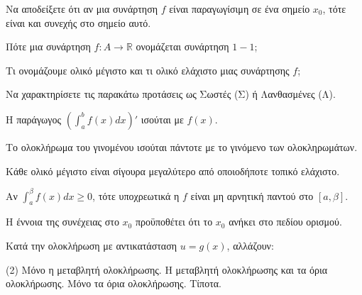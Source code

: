 \documentclass[11pt,a4paper]{article}
\newcommand{\kerkissans}[1]{{\fontfamily{maksf}\selectfont \textbf{#1}}}
\renewcommand{\textdexiakeraia}{}
\newcommand{\dint}{\displaystyle\int}
\newcommand\themanum{A}
\newcounter{thema}[section]
\renewcommand{\thethema}{\arabic{thema}}
\newcommand{\Thema}{\refstepcounter{thema}{\textbf{\textcolor{black}{\faPenSquare\ \  \large \kerkissans{\textbf{\thethemaο\hspace{2mm}Διαγώνισμα - Θέμα \themanum}}}}}\hspace{0mm}}{}
\newenvironment{thema}[1]
{\begin{tcolorbox}[title=\Thema\kerkissans{\textbf{\large{  #1}}},breakable,
enhanced standard,titlerule=0pt,toprule=0pt, rightrule=0pt, bottomrule=0pt,
colback=white,left=0mm,top=1mm,bottom=0mm,
boxrule=0pt,
colframe=white,leftrule=0mm,sharp corners,coltitle=black]
\renewcommand{\themanum}{#1}}
{\end{tcolorbox}}
\begin{document}
\begin{thema}{A}
\begin{erwthma}
    \item Να αποδείξετε ότι αν μια συνάρτηση $f$ είναι παραγωγίσιμη σε ένα σημείο $x_0$, τότε είναι και συνεχής στο σημείο αυτό.
    \item Πότε μια συνάρτηση $f:A\to\mathbb{R}$ ονομάζεται συνάρτηση $1-1$;
    \item Τι ονομάζουμε ολικό μέγιστο και τι ολικό ελάχιστο μιας συνάρτησης $f$;
    \item Να χαρακτηρίσετε τις παρακάτω προτάσεις ως Σωστές (Σ) ή Λανθασμένες (Λ).
    \begin{alist}
        \item Η παράγωγος $\left(\dint_a^b f(x) dx \right)'$ ισούται με $ f(x)$.
        \item Το ολοκλήρωμα του γινομένου ισούται πάντοτε με το γινόμενο των ολοκληρωμάτων.
        \item Κάθε ολικό μέγιστο είναι σίγουρα μεγαλύτερο από οποιοδήποτε τοπικό ελάχιστο.
        \item Αν $\dint_a^\beta f(x) dx \ge 0$, τότε υποχρεωτικά η $f$ είναι μη αρνητική παντού στο $[a, \beta]$.
        \item Η έννοια της συνέχειας στο $x_0$ προϋποθέτει ότι το $x_0$ ανήκει στο πεδίου ορισμού.
    \end{alist}
    \item Κατά την ολοκλήρωση με αντικατάσταση $u = g(x)$, αλλάζουν:
    \begin{tasks}[label=\let\textdexiakeraia\relax\alph*.](2)
        \task Μόνο η μεταβλητή ολοκλήρωσης.
        \task H μεταβλητή ολοκλήρωσης και τα όρια ολοκλήρωσης.
        \task Μόνο τα όρια ολοκλήρωσης.
        \task Τίποτα.
    \end{tasks}
\end{erwthma}
\end{thema}
\vspace{1cm}
\end{document}
